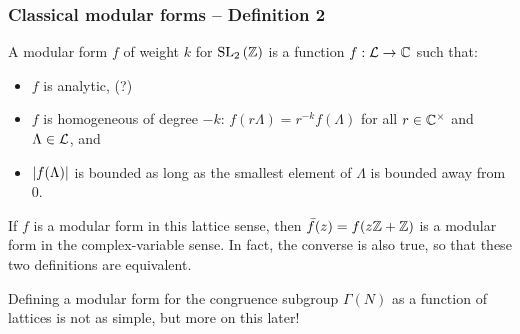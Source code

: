 \begin{frame} \frametitle{Classical modular forms -- Definition 2}
  \begin{definition}
    A modular form $f$ of weight $k$ for $\SL[2]{\ZZ}$ is a function $f : \LL \to \CC$ such that:
    \begin{itemize}
      \item $f$ is analytic\pause, \hfill (?) \pause
      \item $f$ is homogeneous of degree $-k$: \pause $f(r\Lambda) = r^{-k} f(\Lambda)$ for all $r \in \CC^\times$ and $\Lambda \in \LL$\pause, and
      \item $\abs{f(\Lambda)}$ is bounded as long as the smallest element of $\Lambda$ is bounded away from $0$.\pause
    \end{itemize}
  \end{definition}

  If $f$ is a modular form in this lattice sense, then $\bar{f}(z) = f(z\ZZ+\ZZ)$ is a modular form in the complex-variable sense.
  In fact, the converse is also true, so that these two definitions are equivalent. \pause

  Defining a modular form for the congruence subgroup $\Gamma(N)$ as a function of lattices is not as simple, but more on this later!
\end{frame}